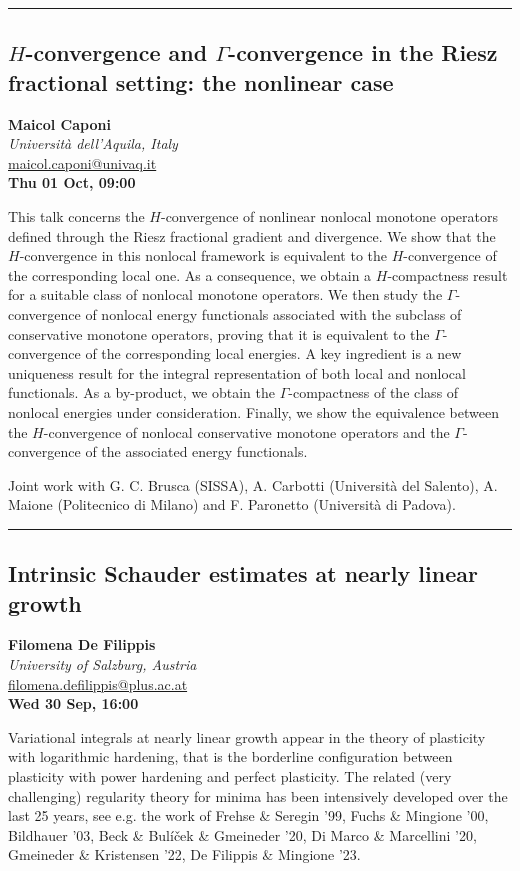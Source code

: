 \documentclass[a4paper,11pt]{article}
\begin{document}
\newpage

\noindent\rule{\textwidth}{0.4pt}

\begin{center}
\subsection*{$H$-convergence and $\Gamma$-convergence in the Riesz fractional setting: the nonlinear case}

\textbf{Maicol Caponi} \\
\textit{Università dell'Aquila, Italy} \\
\url{maicol.caponi@univaq.it} \\
\textbf{Thu 01 Oct, 09:00}
\
\end{center}
\medskip
This talk concerns the $H$-convergence of nonlinear nonlocal monotone operators defined through the Riesz fractional gradient and divergence. We show that the $H$-convergence in this nonlocal framework is equivalent to the $H$-convergence of the corresponding local one. As a consequence, we obtain a $H$-compactness result for a suitable class of nonlocal monotone operators. We then study the $\Gamma$-convergence of nonlocal energy functionals associated with the subclass of conservative monotone operators, proving that it is equivalent to the $\Gamma$-convergence of the corresponding local energies. A key ingredient is a new uniqueness result for the integral representation of both local and nonlocal functionals. As a by-product, we obtain the $\Gamma$-compactness of the class of nonlocal energies under consideration. Finally, we show the equivalence between the $H$-convergence of nonlocal conservative monotone operators and the $\Gamma$-convergence of the associated energy functionals.

\smallskip
Joint work with G. C. Brusca (SISSA), A. Carbotti (Università del Salento), A. Maione (Politecnico di Milano) and F. Paronetto (Università di Padova).

\newpage

\noindent\rule{\textwidth}{0.4pt}

\begin{center}
\subsection*{Intrinsic Schauder estimates at nearly linear growth}

\textbf{Filomena De Filippis} \\
\textit{University of Salzburg, Austria} \\
\url{filomena.defilippis@plus.ac.at} \\
\textbf{Wed 30 Sep, 16:00}
\
\end{center}
\medskip
Variational integrals at nearly linear growth appear in the theory of plasticity with logarithmic hardening, that is the borderline configuration between plasticity with power hardening and perfect plasticity. The related (very challenging) regularity theory for minima has been intensively developed over the last 25 years, see e.g. the work of Frehse \& Seregin '99, Fuchs \& Mingione '00, Bildhauer '03, Beck \& Bulíček \& Gmeineder '20, Di Marco \& Marcellini '20, Gmeineder \& Kristensen '22, De Filippis \& Mingione '23.
\end{document}
